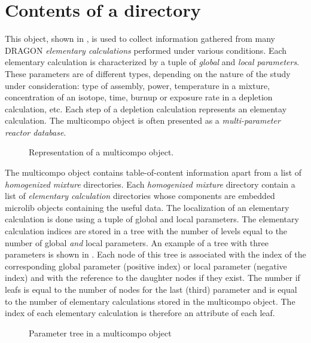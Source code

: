 \section{Contents of a  directory}\label{sect:multicompodir}

This object, shown in , is used to collect information gathered
from many DRAGON {\sl elementary calculations} performed under various conditions.
Each elementary calculation is characterized by a tuple of {\sl global} and {\sl local parameters}.
These parameters are of different types, depending on the nature of the
study under consideration: type of assembly, power, temperature in a mixture,
concentration of an isotope, time, burnup or exposure rate in a depletion calculation,
etc. Each step of a depletion calculation represents an elementay calculation.
The {\sc multicompo} object is often presented as a {\sl multi-parameter reactor database}.

\begin{figure}[h!]
\begin{center} 
\epsfxsize=9cm
\centerline{ }
\parbox{15cm}{\caption{Representation of a {\sc multicompo} 
object.}\label{fig:multicompo}}   
\end{center}  
\end{figure}

\vskip 0.2cm

The {\sc multicompo} object contains table-of-content information apart from a list
of {\sl homogenized mixture} directories. Each {\sl homogenized mixture}
directory contain a list of {\sl elementary calculation} directories whose
components are embedded {\sc microlib} objects containing the useful data.
The localization of an elementary calculation
is done using a tuple of global and local parameters. The elementary calculation indices are
stored in a tree with the number of levels equal to the number of global {\sl and} local parameters.
An example of a tree with three parameters is shown in . Each node
of this tree is associated with the index of the corresponding global parameter (positive index) or
local parameter (negative index) and with the
reference to the daughter nodes if they exist. The number if leafs is equal to the number
of nodes for the last (third) parameter and is equal to the number of elementary
calculations stored in the {\sc multicompo} object. The index of each elementary calculation is
therefore an attribute of each leaf.

\begin{figure}[h!]  
\begin{center} 
\epsfxsize=12cm
\centerline{ }
\parbox{14cm}{\caption{Parameter tree in a {\sc multicompo} object}\label{fig:ctree}}   
\end{center}  
\end{figure}

